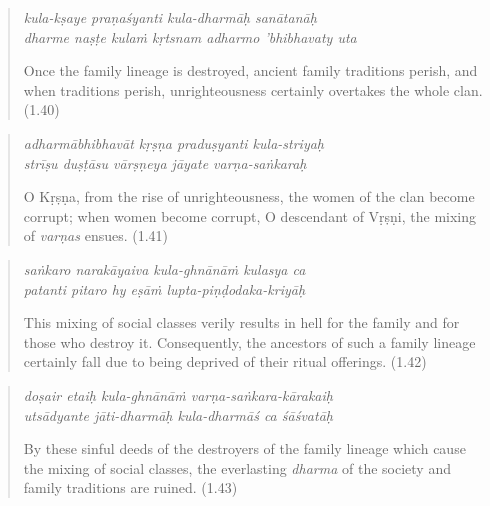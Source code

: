 \documentclass[12pt, twoside, openright]{memoir}
\begin{document}
\par
\begin{verse}
\textit{kula-kṣaye praṇaśyanti kula-dharmāḥ sanātanāḥ} \\
\textit{dharme naṣṭe kulaṁ kṛtsnam adharmo ’bhibhavaty uta}

\noindent Once the family lineage is destroyed, ancient family traditions perish, and when traditions perish, unrighteousness certainly overtakes the whole clan. (1.40)
\end{verse}
\par



\par
\begin{verse}
\textit{adharmābhibhavāt kṛṣṇa praduṣyanti kula-striyaḥ} \\
\textit{strīṣu duṣṭāsu vārṣṇeya jāyate varṇa-saṅkaraḥ}

\noindent O Kṛṣṇa, from the rise of unrighteousness, the women of the clan become corrupt; when women become corrupt, O descendant of Vṛṣṇi, the mixing of \textit{varṇas} ensues. (1.41)
\end{verse}
\par



\par
\begin{verse}
\textit{saṅkaro narakāyaiva kula-ghnānāṁ kulasya ca} \\
\textit{patanti pitaro hy eṣāṁ lupta-piṇḍodaka-kriyāḥ}

\noindent This mixing of social classes verily results in hell for the family and for those who destroy it. Consequently, the ancestors of such a family lineage certainly fall due to being deprived of their ritual offerings. (1.42)
\end{verse}
\par



\par
\begin{verse}
\textit{doṣair etaiḥ kula-ghnānāṁ varṇa-saṅkara-kārakaiḥ} \\
\textit{utsādyante jāti-dharmāḥ kula-dharmāś ca śāśvatāḥ}

\noindent By these sinful deeds of the destroyers of the family lineage which cause the mixing of social classes, the everlasting \textit{dharma} of the society and family traditions are ruined. (1.43)
\end{verse}
\par
\end{document}
